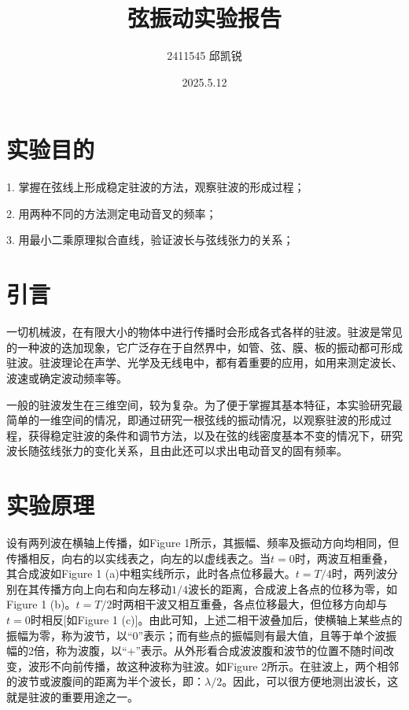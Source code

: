 \documentclass{article}
\title{弦振动实验报告}
\author{2411545 邱凯锐}
\date{2025.5.12}
\begin{document}
\maketitle
\section{实验目的}
1. 掌握在弦线上形成稳定驻波的方法，观察驻波的形成过程；

2. 用两种不同的方法测定电动音叉的频率；

3. 用最小二乘原理拟合直线，验证波长与弦线张力的关系； 
\section{引言}
一切机械波，在有限大小的物体中进行传播时会形成各式各样的驻波。驻波是常见的一种波的迭加现象，它广泛存在于自然界中，如管、弦、膜、板的振动都可形成驻波。驻波理论在声学、光学及无线电中，都有着重要的应用，如用来测定波长、波速或确定波动频率等。

一般的驻波发生在三维空间，较为复杂。为了便于掌握其基本特征，本实验研究最简单的一维空间的情况，即通过研究一根弦线的振动情况，以观察驻波的形成过程，获得稳定驻波的条件和调节方法，以及在弦的线密度基本不变的情况下，研究波长随弦线张力的变化关系，且由此还可以求出电动音叉的固有频率。 
\section{实验原理}
设有两列波在横轴上传播，如Figure 1所示，其振幅、频率及振动方向均相同，但传播相反，向右的以实线表之，向左的以虚线表之。当\(t = 0\)时，两波互相重叠，其合成波如Figure 1 (a)中粗实线所示，此时各点位移最大。\(t = T/4\)时，两列波分别在其传播方向上向右和向左移动\(1/4\)波长的距离，合成波上各点的位移为零，如Figure 1 (b)。\(t = T/2\)时两相干波又相互重叠，各点位移最大，但位移方向却与\(t = 0\)时相反[如Figure 1 (c)]。由此可知，上述二相干波叠加后，使横轴上某些点的振幅为零，称为波节，以“0”表示；而有些点的振幅则有最大值，且等于单个波振幅的2倍，称为波腹，以“+”表示。从外形看合成波波腹和波节的位置不随时间改变，波形不向前传播，故这种波称为驻波。如Figure 2所示。在驻波上，两个相邻的波节或波腹间的距离为半个波长，即：\(\lambda/2\)。因此，可以很方便地测出波长，这就是驻波的重要用途之一。
\end{document}
